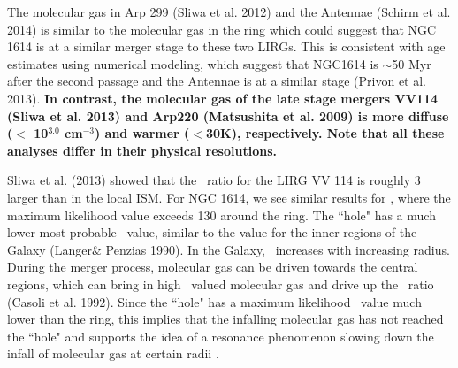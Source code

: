 
The molecular gas in Arp 299 (Sliwa et al. 2012) and the Antennae (Schirm et al. 2014) is similar to the molecular gas in the ring which could suggest that NGC 1614 is at a similar merger stage to these two LIRGs. This is consistent with age estimates using numerical modeling, which suggest that NGC1614 is $\sim$50 Myr after the second passage \citep{Vaisanen2012} and the Antennae is at a similar stage (Privon et al. 2013)\nocite{Privon2013}. \textbf{In contrast, the molecular gas of the late stage mergers VV114 (Sliwa et al. 2013) and Arp220 (Matsushita et al. 2009)\nocite{Matsushita2009} is more diffuse ($<$ 10$^{3.0}$ cm$^{-3}$) and warmer ($<$30K), respectively. Note that all these analyses differ in their physical resolutions.}


Sliwa et al. (2013) showed that the \xco\ ratio for the LIRG VV 114 is roughly 3 larger than in the local ISM. For NGC 1614, we see similar results for \xco, where the maximum likelihood value exceeds 130 around the ring. The ``hole" has a much lower most probable \xco\ value, similar to the value for the inner regions of the Galaxy (Langer$\&$ Penzias 1990)\nocite{Langer1990}. In the Galaxy, \xco\ increases with increasing radius. During the merger process, molecular gas can be driven towards the central regions, which can bring in high \xco\ valued molecular gas and drive up the \xco\ ratio (Casoli et al. 1992)\nocite{Casoli1992}. Since the ``hole" has a maximum likelihood \xco\ value much lower than the ring, this implies that the infalling molecular gas has not reached the ``hole" and supports the idea of a resonance phenomenon slowing down the infall of molecular gas at certain radii \citep{Konig2013}. 

